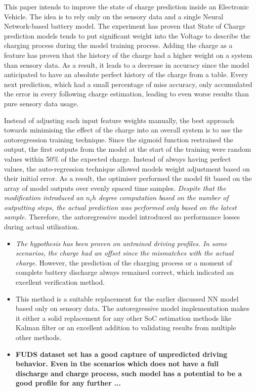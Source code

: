 This paper intends to improve the state of charge prediction inside an Electronic Vehicle.
The idea is to rely only on the sensory data and a single Neural Network-based battery model.
The experiment has proven that State of Charge prediction models tends to put significant weight into the Voltage to describe the charging process during the model training process.
Adding the charge as a feature has proven that the history of the charge had a higher weight on a system than sensory data.
As a result, it leads to a decrease in accuracy since the model anticipated to have an absolute perfect history of the charge from a table.
Every next prediction, which had a small percentage of miss accuracy, only accumulated the error in every following charge estimation, leading to even worse results than pure sensory data usage.

%
%
Instead of adjusting each input feature weights manually, the best approach towards minimising the effect of the charge into an overall system is to use the autoregression training technique.
Since the sigmoid function restrained the output, the first outputs from the model at the start of the training were random values within 50\% of the expected charge.
Instead of always having perfect values, the auto-regression technique allowed models weight adjustment based on their initial error.
As a result, the optimiser performed the model fit based on the array of model outputs over evenly spaced time samples.
\textit{Despite that the modification introduced an $n_th$ degree computation based on the number of outputting steps, the actual prediction was performed only based on the latest sample.}
Therefore, the autoregressive model introduced no performance losses during actual utilisation. 

\begin{itemize}
    \item \textit{The hypothesis has been proven on untrained driving profiles. In some scenarios, the charge had an offset since the mismatches with the actual charge.}
    However, the prediction of the charging process or a moment of complete battery discharge always remained correct, which indicated an excellent verification method. \\
    
    \item This method is a suitable replacement for the earlier discussed NN model based only on sensory data.
    The autoregressive model implementation makes it either a solid replacement for any other SoC estimation methods like Kalman filter or an excellent addition to validating results from multiple other methods.

    \item \textbf{FUDS dataset set has a good capture of unpredicted driving behavior. Even in the scenarios which does not have a full discharge and charge process, such model has a potential to be a good profile for any further ...}

\end{itemize}
